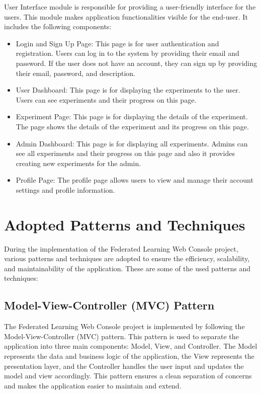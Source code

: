 User Interface module is responsible for providing a user-friendly interface for the users. This module makes application functionalities visible for the end-user. It includes the following components:\\
\begin{itemize}
    \item Login and Sign Up Page: This page is for user authentication and registration. Users can log in to the system by providing their email and password. If the user does not have an account, they can sign up by providing their email, password, and description.
    \item User Dashboard: This page is for displaying the experiments to the user. Users can see experiments and their progress on this page.
    \item Experiment Page: This page is for displaying the details of the experiment. The page shows the details of the experiment and its progress on this page.
    \item Admin Dashboard: This page is for displaying all experiments. Admins can see all experiments and their progress on this page and also it provides creating new experiments for the admin.
    \item Profile Page: The profile page allows users to view and manage their account settings and profile information.
\end{itemize}

\section{Adopted Patterns and Techniques}


During the implementation of the Federated Learning Web Console project, various patterns and techniques are adopted to ensure the efficiency, scalability, and maintainability of the application. These are some of the used patterns and techniques:\\

\subsection{Model-View-Controller (MVC) Pattern}
The Federated Learning Web Console project is implemented by following the Model-View-Controller (MVC) pattern. This pattern is used to separate the application into three main components: Model, View, and Controller. The Model represents the data and business logic
of the application, the View represents the presentation layer, and the Controller handles the user input and updates the model and view accordingly. This pattern ensures a clean separation of concerns and makes the application easier to maintain and extend.\\

